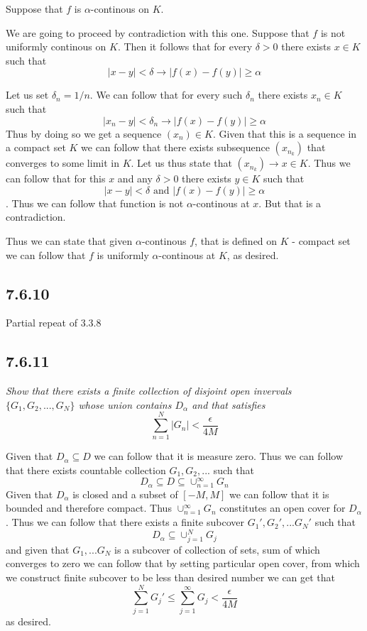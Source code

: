 \documentclass[11pt,oneside,titlepage]{book}
\begin{document}
Suppose that $f$ is $\alpha$-continous on $K$.

We are going to proceed by contradiction with this one. Suppose that
$f$ is not uniformly continous on $K$. Then it follows that for every
$\delta > 0$  there exists $x \in K$ such that
$$|x - y| < \delta \to |f(x) - f(y)| \geq \alpha$$

Let us set $\delta_n = 1/n$. We can follow that for every such $\delta_n$
there exists $x_n \in K$ such that
$$|x_n - y| < \delta_n \to |f(x) - f(y)| \geq \alpha$$
Thus by doing so we get a sequence $(x_n) \in K$. Given that this is a
sequence in a compact set $K$ we can follow that there exists subsequence
$(x_{n_k})$ that converges to some limit in $K$. Let us thus state that
$(x_{n_k}) \to x \in K$. Thus we can follow that for this $x$ and
any $\delta > 0$  there exists $y \in K$ such that 
$$|x - y| < \delta \text{ and } |f(x) - f(y)| \geq \alpha$$
. Thus we can follow that function is not
$\alpha$-continous at $x$. But that is a contradiction.

Thus we can state that given $\alpha$-continous  $f$, that is defined on $K$ -
compact set we can follow that $f$ is uniformly $\alpha$-continous at $K$, as
desired.

\subsection*{7.6.10}

Partial repeat of 3.3.8

\subsection*{7.6.11}
\textit{Show that there exists a finite collection of disjoint open invervals
  $\{G_1, G_2, ..., G_N\}$ whose union contains $D_\alpha$ and that satisfies}
$$\sum_{n = 1}^N{|G_n|} < \frac{\epsilon}{4M}$$

Given that $D_\alpha \subseteq D$ we can follow that it is measure zero. Thus
we can follow that there exists countable collection $G_1, G_2, ... $ such that
$$D_\alpha \subseteq D \subseteq \cup_{n = 1}^\infty{G_n} $$
Given that $D_\alpha$ is closed and a subset of $[-M, M]$ we can follow that
it is bounded and therefore compact. Thus $\cup_{n = 1}^\infty{G_n} $
constitutes an open cover for $D_\alpha$. Thus we can follow that there exists
a finite subcover $G_1', G_2', ... G_N'$ such that
$$D_\alpha \subseteq  \cup_{j = 1}^N{G_j}$$
and given that $G_1, ... G_N$ is a subcover of collection of sets, sum of which
converges to zero we can follow that by setting particular open cover,
from which
we construct finite subcover to be less than desired number we can get that
$$\sum_{j = 1}^N{G_j'} \leq \sum_{j = 1}^\infty{G_j} <
\frac{\epsilon}{4M}$$ 
as desired.
\end{document}
